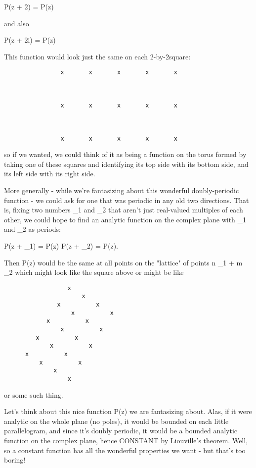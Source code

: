 			P(z + 2\pi ) = P(z)

and also 

                        P(z + 2\pi i) = P(z)

This function would look just the same on each 2\pi -by-2\pi  square:

\begin{verbatim}
                x       x       x       x       x



                x       x       x       x       x



                x       x       x       x       x
\end{verbatim}
    

so if we wanted, we could think of it as being a function on the torus
formed by taking one of these squares and identifying its top side with
its bottom side, and its left side with its right side.  

More generally - while we're fantasizing about this wonderful
doubly-periodic function - we could ask for one that was periodic in any
old two directions.  That is, fixing two numbers \omega _{1} and 
\omega _{2}
that aren't just real-valued multiples of each other, we could hope to
find an analytic function on the complex plane with \omega _{1} 
and \omega _{2} as periods:

                      P(z + \omega _{1}) = P(z)
                      P(z + \omega _{2}) = P(z).

Then P(z) would be the same at all points on the "lattice" of points
n \omega _{1} + m \omega _{2}
which might look like the square above or might be like


\begin{verbatim}
                  x
                      x
               x          x
                   x          x 
            x          x
                x          x
         x          x
             x          x
      x          x   
          x          x
              x 
                  x

\end{verbatim}
    

or some such thing.  

Let's think about this nice function P(z) we are fantasizing
about.  Alas, if it were analytic on the whole plane (no poles), it
would be bounded on each little parallelogram, and since it's doubly
periodic, it would be a bounded analytic function on the complex plane,
hence CONSTANT by Liouville's theorem.  Well, so a constant function has
all the wonderful properties we want - but that's too boring!

